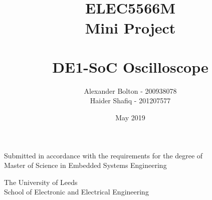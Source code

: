 \documentclass[a4paper,12pt]{article}
\begin{document}
\title{\\ \textbf{ELEC5566M \\ Mini Project \\ \- \\ DE1-SoC Oscilloscope }}
\author{Alexander Bolton - 200938078 \\ Haider Shafiq - 201207577}
\date{May 2019}
\maketitle
\begin{center}
Submitted in accordance with the requirements for the degree of \\
Master of Science in Embedded Systems Engineering
\end{center}
\vfill
\begin{center}
The University of Leeds \\  School of Electronic and Electrical Engineering
\end{center}
\newpage

\tableofcontents
\newpage 
\end{document}
